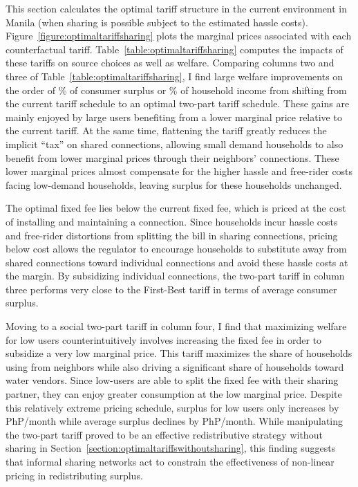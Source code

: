 \documentclass[12pt]{article}
\begin{document}
This section calculates the optimal tariff structure in the current environment in Manila (when sharing is possible subject to the estimated hassle costs).  Figure~\ref{figure:optimaltariffsharing} plots the marginal prices associated with each counterfactual tariff.  Table~\ref{table:optimaltariffsharing} computes the impacts of these tariffs on source choices as well as welfare.  Comparing columns two and three of Table~\ref{table:optimaltariffsharing}, I find large welfare improvements on the order of \unskip\% of consumer surplus or \unskip\% of household income from shifting from the current tariff schedule to an optimal two-part tariff schedule.  These gains are mainly enjoyed by large users benefiting from a lower marginal price relative to the current tariff.  At the same time, flattening the tariff greatly reduces the implicit ``tax'' on shared connections, allowing small demand households to also benefit from lower marginal prices through their neighbors' connections.  These lower marginal prices almost compensate for the higher hassle and free-rider costs facing low-demand households, leaving surplus for these households unchanged.

The optimal fixed fee lies below the current fixed fee, which is priced at the cost of installing and maintaining a connection.  Since households incur hassle costs and free-rider distortions from splitting the bill in sharing connections, pricing below cost allows the regulator to encourage households to substitute away from shared connections toward individual connections and avoid these hassle costs at the margin.  By subsidizing individual connections, the two-part tariff in column three performs very close to the First-Best tariff in terms of average consumer surplus.  

 Moving to a social two-part tariff in column four, I find that maximizing welfare for low users counterintuitively involves increasing the fixed fee in order to subsidize a very low marginal price.  This tariff maximizes the share of households using from neighbors while also driving a significant share of households toward water vendors.  Since low-users are able to split the fixed fee with their sharing partner, they can enjoy greater consumption at the low marginal price.  Despite this relatively extreme pricing schedule, surplus for low users only increases by PhP/month while average surplus declines by PhP/month.  While manipulating the two-part tariff proved to be an effective redistributive strategy without sharing in Section~\ref{section:optimaltariffswithoutsharing}, this finding suggests that informal sharing networks act to constrain the effectiveness of non-linear pricing in redistributing surplus.  
\end{document}
